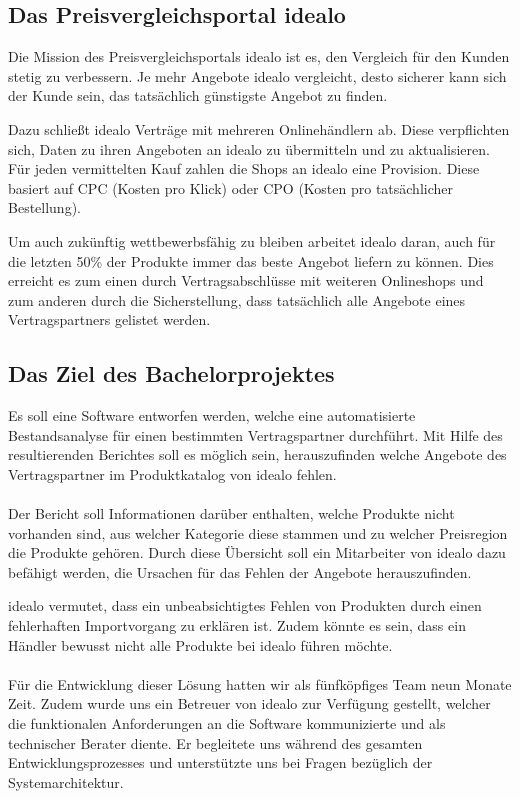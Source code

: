 \subsection{Das Preisvergleichsportal idealo}
\label{subsec:idealo}

Die Mission des Preisvergleichsportals idealo ist es, den Vergleich für den Kunden stetig zu verbessern.
Je mehr Angebote idealo vergleicht, desto sicherer kann sich der Kunde sein, das tatsächlich günstigste Angebot zu
finden.

Dazu schließt idealo Verträge mit mehreren Onlinehändlern ab.
Diese verpflichten sich, Daten zu ihren Angeboten an idealo zu übermitteln und zu aktualisieren.
Für jeden vermittelten Kauf zahlen die Shops an idealo eine Provision.
Diese basiert auf CPC (Kosten pro Klick) oder CPO (Kosten pro tatsächlicher Bestellung).

Um auch zukünftig wettbewerbsfähig zu bleiben arbeitet idealo daran, auch für die letzten 50\% der Produkte
immer das beste Angebot liefern zu können.
Dies erreicht es zum einen durch Vertragsabschlüsse mit weiteren Onlineshops und zum anderen durch die
Sicherstellung, dass tatsächlich alle Angebote eines Vertragspartners gelistet werden.

\subsection{Das Ziel des Bachelorprojektes}
\label{subsec:projektziel}

Es soll eine Software entworfen werden, welche eine automatisierte Bestandsanalyse für einen bestimmten
Vertragspartner durchführt.
Mit Hilfe des resultierenden Berichtes soll es möglich sein, herauszufinden welche Angebote des Vertragspartner im
Produktkatalog von idealo fehlen.
\\
\\
Der Bericht soll Informationen darüber enthalten, welche Produkte nicht vorhanden sind, aus welcher Kategorie diese
stammen und zu welcher Preisregion die Produkte gehören.
Durch diese Übersicht soll ein Mitarbeiter von idealo dazu befähigt werden, die Ursachen für das Fehlen der Angebote
herauszufinden.

idealo vermutet, dass ein unbeabsichtigtes Fehlen von Produkten durch einen fehlerhaften Importvorgang zu erklären ist.
Zudem könnte es sein, dass ein Händler bewusst nicht alle Produkte bei idealo führen möchte.
\\
\\
Für die Entwicklung dieser Lösung hatten wir als fünfköpfiges Team neun Monate Zeit.
Zudem wurde uns ein Betreuer von idealo zur Verfügung gestellt, welcher die funktionalen Anforderungen an die
Software kommunizierte und als technischer Berater diente.
Er begleitete uns während des gesamten Entwicklungsprozesses und unterstützte uns bei Fragen bezüglich der
Systemarchitektur.

